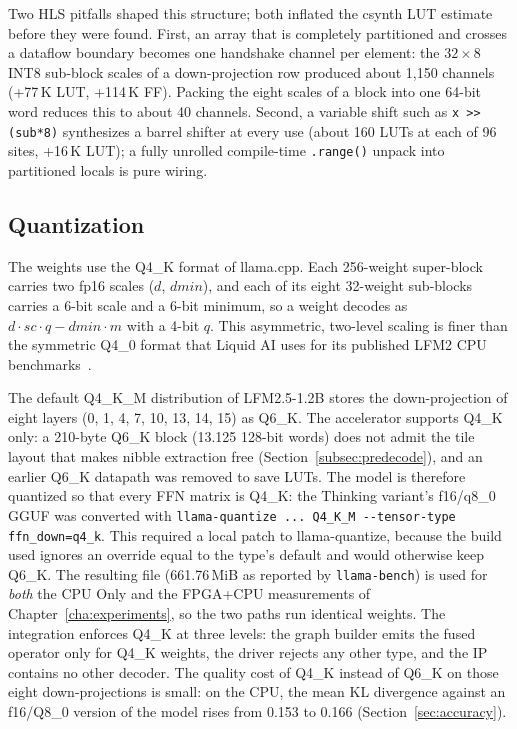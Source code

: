 Two HLS pitfalls shaped this structure; both inflated the csynth LUT estimate before they
were found. First, an array that is completely partitioned and crosses a dataflow
boundary becomes one handshake channel per element: the $32\times8$ INT8 sub-block scales
of a down-projection row produced about 1,150 channels (+77\,K LUT, +114\,K FF). Packing
the eight scales of a block into one 64-bit word reduces this to about 40 channels.
Second, a variable shift such as \texttt{x >> (sub*8)} synthesizes a barrel shifter at
every use (about 160 LUTs at each of 96 sites, +16\,K LUT); a fully unrolled compile-time
\texttt{.range()} unpack into partitioned locals is pure wiring.

\subsection{Quantization}

\label{subsec:quant}
The weights use the Q4\_K format of llama.cpp. Each 256-weight super-block carries two
fp16 scales ($d$, $dmin$), and each of its eight 32-weight sub-blocks carries a 6-bit
scale and a 6-bit minimum, so a weight decodes as $d\cdot sc\cdot q - dmin\cdot m$ with a
4-bit $q$. This asymmetric, two-level scaling is finer than the symmetric Q4\_0 format
that Liquid AI uses for its published LFM2 CPU benchmarks~\cite{amini2025lfm2technicalreport}.

The default Q4\_K\_M distribution of LFM2.5-1.2B stores the down-projection of eight
layers (0, 1, 4, 7, 10, 13, 14, 15) as Q6\_K. The accelerator supports Q4\_K only: a
210-byte Q6\_K block (13.125 128-bit words) does not admit the tile layout that makes
nibble extraction free (Section~\ref{subsec:predecode}), and an earlier Q6\_K datapath
was removed to save LUTs. The model is therefore quantized so that every FFN matrix is
Q4\_K: the Thinking variant's f16/q8\_0 GGUF was converted with
\texttt{llama-quantize ... Q4\_K\_M -{-}tensor-type ffn\_down=q4\_k}. This required a
local patch to llama-quantize, because the build used ignores an override equal to the
type's default and would otherwise keep Q6\_K. The resulting file (661.76\,MiB as
reported by \texttt{llama-bench}) is used for \emph{both} the CPU Only and the FPGA+CPU
measurements of Chapter~\ref{cha:experiments}, so the two paths run identical weights.
The integration enforces Q4\_K at three levels: the graph builder emits the fused
operator only for Q4\_K weights, the driver rejects any other type, and the IP contains
no other decoder. The quality cost of Q4\_K instead of Q6\_K on those eight
down-projections is small: on the CPU, the mean KL divergence against an f16/Q8\_0
version of the model rises from 0.153 to 0.166 (Section~\ref{sec:accuracy}).

